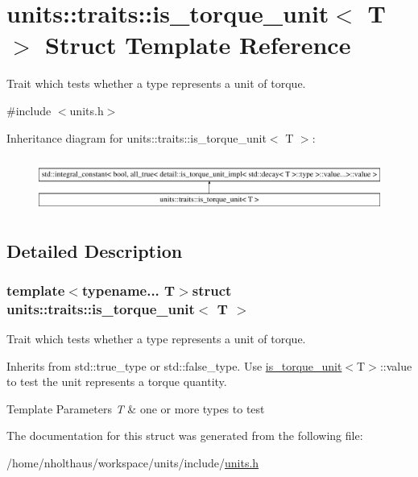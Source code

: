 \hypertarget{structunits_1_1traits_1_1is__torque__unit}{}\section{units\+:\+:traits\+:\+:is\+\_\+torque\+\_\+unit$<$ T $>$ Struct Template Reference}
\label{structunits_1_1traits_1_1is__torque__unit}


Trait which tests whether a type represents a unit of torque.  




{\ttfamily \#include $<$units.\+h$>$}

Inheritance diagram for units\+:\+:traits\+:\+:is\+\_\+torque\+\_\+unit$<$ T $>$\+:\begin{figure}[H]
\begin{center}
\leavevmode
\includegraphics[height=1.786284cm]{structunits_1_1traits_1_1is__torque__unit}
\end{center}
\end{figure}


\subsection{Detailed Description}
\subsubsection*{template$<$typename... T$>$struct units\+::traits\+::is\+\_\+torque\+\_\+unit$<$ T $>$}

Trait which tests whether a type represents a unit of torque. 

Inherits from {\ttfamily std\+::true\+\_\+type} or {\ttfamily std\+::false\+\_\+type}. Use {\ttfamily \hyperlink{structunits_1_1traits_1_1is__torque__unit}{is\+\_\+torque\+\_\+unit}$<$T$>$\+::value} to test the unit represents a torque quantity. 
\begin{DoxyTemplParams}{Template Parameters}
{\em T} & one or more types to test \\
\hline
\end{DoxyTemplParams}


The documentation for this struct was generated from the following file\+:\begin{DoxyCompactItemize}
\item 
/home/nholthaus/workspace/units/include/\hyperlink{units_8h}{units.\+h}\end{DoxyCompactItemize}
